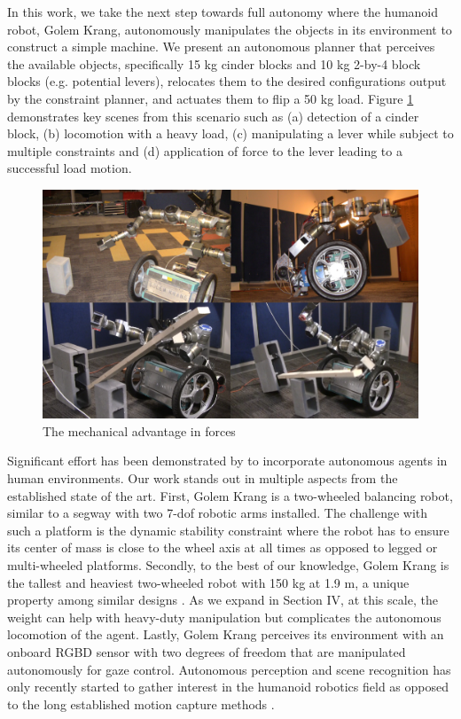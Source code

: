 \documentclass[runningheads,a4paper]{llncs}
\begin{document}
In this work, we take the next step towards full autonomy where the humanoid robot, Golem Krang,
autonomously manipulates the objects in its environment to construct a simple machine. We present
an autonomous planner that perceives the available objects, specifically 15 kg cinder blocks and 10
kg 2-by-4 block blocks (e.g. potential levers), relocates them to the desired configurations output
by the constraint planner, and actuates them to flip a 50 kg load. Figure \ref{fig:showOff} demonstrates key scenes
from this scenario such as (a) detection of a cinder block, (b) locomotion with a heavy load, (c)
manipulating a lever while subject to multiple constraints and (d) application of force to the lever
leading to a successful load motion.

\begin{figure}[ht!] 
  \centering
  \includegraphics[width=1.0\linewidth]{Figures/showOff.png}
  \caption{The mechanical advantage in forces}
  \label{fig:showOff}
\end{figure}

Significant effort has been demonstrated by \cite{beetz2010cram} \cite{stilman2005navigation}
\cite{kemp2007challenges} to incorporate autonomous agents in human environments. Our work stands
out in multiple aspects from the established state of the art. First, Golem Krang is a two-wheeled
balancing robot, similar to a segway with two 7-dof robotic arms installed. The challenge with
such a platform is the dynamic stability constraint where the robot has to ensure its center of mass
is close to the wheel axis at all times as opposed to legged or multi-wheeled platforms. Secondly, to the best of our knowledge,
Golem Krang is the tallest and heaviest two-wheeled robot with 150 kg at 1.9 m, a unique property
among similar designs \cite{kuindersma2009dexterous}. As we expand in Section IV, at this scale, the
weight can help with heavy-duty manipulation but complicates the autonomous locomotion of the
agent. Lastly, Golem Krang perceives its environment with an onboard RGBD sensor with two degrees
of freedom that are manipulated autonomously for gaze control. Autonomous perception and scene
recognition has only recently started to gather interest in the humanoid robotics field
\cite{srinivasa2010herb} \cite{nishiwaki2000design} as opposed to the long established motion
capture methods \cite{dasgupta1999making}.
\end{document}
